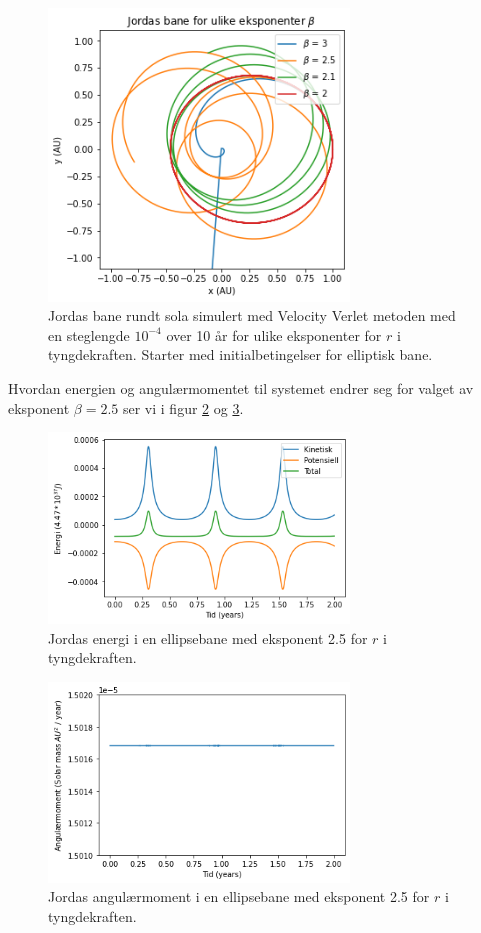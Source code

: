 \documentclass[reprint,english,notitlepage]{revtex4-1}
\begin{document}
	\begin{figure}[H]
		\includegraphics[width=80mm]{../../Code/Figures/betaell.png}
		\caption{Jordas bane rundt sola simulert med Velocity Verlet metoden med en steglengde $10^{-4}$ over 10 år for ulike eksponenter for $r$ i tyngdekraften. Starter med initialbetingelser for elliptisk bane.}
		\label{fig:betaell}
	\end{figure}
	Hvordan energien og angulærmomentet til systemet endrer seg for valget av eksponent $\beta = 2.5$ ser vi i figur \ref{fig:betaen} og \ref{fig:betaang}.

	\begin{figure}[H]
		\includegraphics[width=80mm]{../../Code/Figures/betaen.png}
		\caption{Jordas energi i en ellipsebane med eksponent 2.5 for $r$ i tyngdekraften.}
		\label{fig:betaen}
	\end{figure}

	\begin{figure}[H]
		\includegraphics[width=80mm]{../../Code/Figures/betaang.png}
		\caption{Jordas angulærmoment i en ellipsebane med eksponent 2.5 for $r$ i tyngdekraften.}
		\label{fig:betaang}
	\end{figure}
\end{document}
